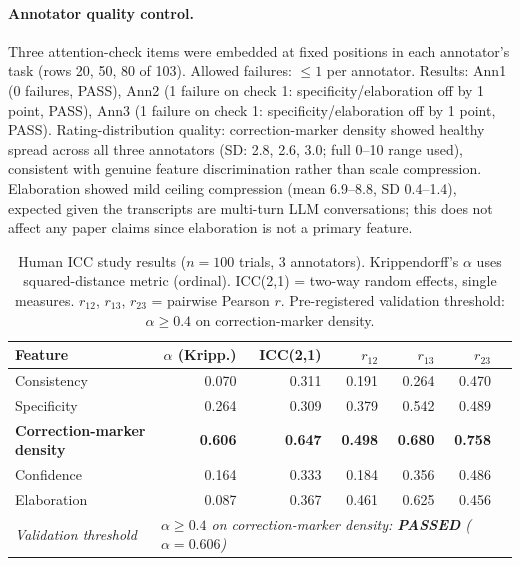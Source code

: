 \paragraph{Annotator quality control.} Three attention-check items were embedded at fixed positions in each annotator's task (rows 20, 50, 80 of 103). Allowed failures: $\leq 1$ per annotator. Results: Ann1 (0 failures, PASS), Ann2 (1 failure on check 1: specificity/elaboration off by 1 point, PASS), Ann3 (1 failure on check 1: specificity/elaboration off by 1 point, PASS). Rating-distribution quality: correction-marker density showed healthy spread across all three annotators (SD: 2.8, 2.6, 3.0; full 0--10 range used), consistent with genuine feature discrimination rather than scale compression. Elaboration showed mild ceiling compression (mean 6.9--8.8, SD 0.4--1.4), expected given the transcripts are multi-turn LLM conversations; this does not affect any paper claims since elaboration is not a primary feature.

\begin{table}[h]
\centering
\caption{Human ICC study results ($n=100$ trials, 3 annotators). Krippendorff's $\alpha$ uses squared-distance metric (ordinal). ICC(2,1) = two-way random effects, single measures. $r_{12}$, $r_{13}$, $r_{23}$ = pairwise Pearson $r$. Pre-registered validation threshold: $\alpha \geq 0.4$ on correction-marker density.}
\label{tab:icc_study_n100}
\begin{tabular}{lrrrrrr}
\toprule
\textbf{Feature} & \textbf{$\alpha$ (Kripp.)} & \textbf{ICC(2,1)} & \textbf{$r_{12}$} & \textbf{$r_{13}$} & \textbf{$r_{23}$} \\
\midrule
Consistency              & 0.070 & 0.311 & 0.191 & 0.264 & 0.470 \\
Specificity              & 0.264 & 0.309 & 0.379 & 0.542 & 0.489 \\
\textbf{Correction-marker density} & \textbf{0.606} & \textbf{0.647} & \textbf{0.498} & \textbf{0.680} & \textbf{0.758} \\
Confidence               & 0.164 & 0.333 & 0.184 & 0.356 & 0.486 \\
Elaboration              & 0.087 & 0.367 & 0.461 & 0.625 & 0.456 \\
\midrule
\textit{Validation threshold} & \multicolumn{5}{l}{\textit{$\alpha \geq 0.4$ on correction-marker density: \textbf{PASSED} ($\alpha=0.606$)}} \\
\bottomrule
\end{tabular}
\end{table}

